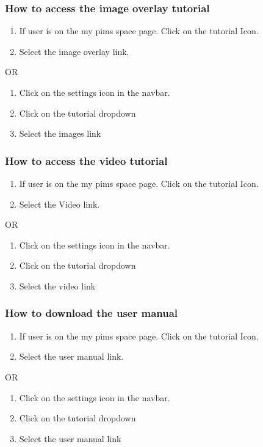 \documentclass[14pt, a4paper]{article}
\begin{document}
\subsubsection{How to access the image overlay tutorial}
\begin{enumerate}
\item If user is on the my pims space page. Click on the tutorial Icon.
\item Select the image overlay link.
\end{enumerate}
\begin{center}OR\end{center}
\begin{enumerate}
\item Click on the settings icon in the navbar.
\item Click on the tutorial dropdown
\item Select the images link
\end{enumerate}
\subsubsection{How to access the video tutorial}
\begin{enumerate}
\item If user is on the my pims space page. Click on the tutorial Icon.
\item Select the Video link.
\end{enumerate}
\begin{center}OR\end{center}
\begin{enumerate}
\item Click on the settings icon in the navbar.
\item Click on the tutorial dropdown
\item Select the video link
\end{enumerate}
\subsubsection{How to download the user manual}
\begin{enumerate}
\item If user is on the my pims space page. Click on the tutorial Icon.
\item Select the user manual link.
\end{enumerate}
\begin{center}OR\end{center}
\begin{enumerate}
\item Click on the settings icon in the navbar.
\item Click on the tutorial dropdown
\item Select the user manual link
\end{enumerate}
\newpage
\end{document}
